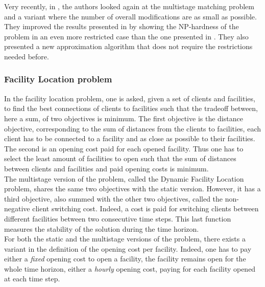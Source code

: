 \documentclass[a4paper]{book}
\begin{document}
Very recently, in \cite{chimani2020approximating}, the authors looked again at the {\sc multistage matching} problem and a variant where the number of overall modifications are as small as possible. They improved the results presented in \cite{bampis2018multistage} by showing the NP-hardness of the problem in an even more restricted case than the one presented in \cite{bampis2018multistage}. They also presented a new approximation algorithm that does not require the restrictions needed before.

\subsubsection{Facility Location problem}

In the {\sc facility location }problem, one is asked, given a set of clients and facilities, to find the best connections of clients to facilities such that the tradeoff between, here a sum, of two objectives is minimum. The first objective is the distance objective, corresponding to the sum of distances from the clients to facilities, each client has to be connected to a facility and as close as possible to their facilities. The second is an opening cost paid for each opened facility. Thus one has to select the least amount of facilities to open such that the sum of distances between clients and facilities and paid opening costs is minimum.\\
The multistage version of the problem, called the {\sc Dynamic Facility Location problem}, shares the same two objectives with the static version. However, it has a third objective, also summed with the other two objectives, called the non-negative client switching cost. Indeed, a cost is paid for switching clients between different facilities between two consecutive time steps. This last function measures the stability of the solution during the time horizon.\\

For both the static and the multistage versions of the problem, there exists a variant in the definition of the opening cost per facility. Indeed, one has to pay either a \textit{fixed} opening cost to open a facility, the facility remains open for the whole time horizon, either a \textit{hourly} opening cost, paying for each facility opened at each time step.\\
\end{document}

